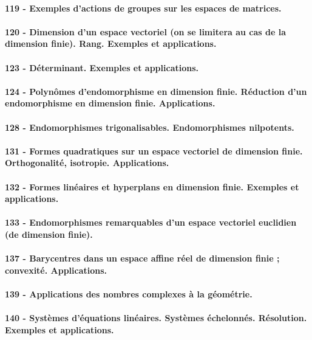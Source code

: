 \paragraph{119 - Exemples d’actions de groupes sur les espaces de matrices.}


\paragraph{120 - Dimension d’un espace vectoriel (on se limitera au cas de la dimension finie). Rang. Exemples et applications.}
\paragraph{123 - Déterminant. Exemples et applications.}
\paragraph{124 - Polynômes d’endomorphisme en dimension finie. Réduction d’un endomorphisme en dimension finie. Applications.}
\paragraph{128 - Endomorphismes trigonalisables. Endomorphismes nilpotents.}
\paragraph{131 - Formes quadratiques sur un espace vectoriel de dimension finie. Orthogonalité, isotropie. Applications.}
\paragraph{132 - Formes linéaires et hyperplans en dimension finie. Exemples et applications.}
\paragraph{133 - Endomorphismes remarquables d’un espace vectoriel euclidien (de dimension finie).}
\paragraph{137 - Barycentres dans un espace affine réel de dimension finie ; convexité. Applications.}
\paragraph{139 - Applications des nombres complexes à la géométrie.}
\paragraph{140 - Systèmes d’équations linéaires. Systèmes échelonnés. Résolution. Exemples et applications.}
